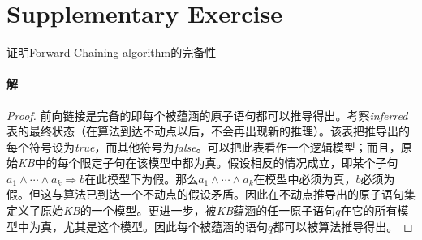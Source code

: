 \documentclass{article}
\begin{document}
\section{Supplementary Exercise}
证明Forward Chaining algorithm的完备性

\paragraph{解}
\begin{proof}
    前向链接是完备的即每个被蕴涵的原子语句都可以推导得出。考察\textit{inferred}表的最终状态（在算法到达不动点以后，不会再出现新的推理）。该表把推导出的每个符号设为\textit{true}，而其他符号为\textit{false}。可以把此表看作一个逻辑模型；而且，原始\textit{KB}中的每个限定子句在该模型中都为真。假设相反的情况成立，即某个子句$a_1 \land \cdots \land a_k \Rightarrow b$在此模型下为假。那么$a_1 \land \cdots \land a_k$在模型中必须为真，$b$必须为假。但这与算法已到达一个不动点的假设矛盾。因此在不动点推导出的原子语句集定义了原始\textit{KB}的一个模型。更进一步，被\textit{KB}蕴涵的任一原子语句$q$在它的所有模型中为真，尤其是这个模型。因此每个被蕴涵的语句$q$都可以被算法推导得出。
\end{proof}
\end{document}
